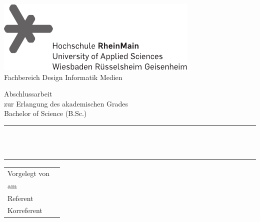 \begin{titlepage}
	\begin{center}
		\includegraphics{hsrm-logo} \\[0.7cm]
		{Fachbereich Design Informatik Medien}
		
		\vfill

		{\LARGE Abschlussarbeit} \\[0.5cm]
		{\large zur Erlangung des akademischen Grades} \\[0.5cm]
		{\large Bachelor of Science (B.Sc.)}
		
		\rule{\textwidth}{1pt}\\[0.5cm]
		{\huge \bfseries \thetitle}\\[0.1cm]
		\rule{\textwidth}{1pt}
		
		\vfill
		
		\begin{tabular}{lr}
			Vorgelegt von & \theauthor \\
			am & \thedate \\
			Referent & \thesupervisor \\
			Korreferent & \thecosupervisor
		\end{tabular}
		
		\vfill
		
		
	\end{center}
\end{titlepage}
